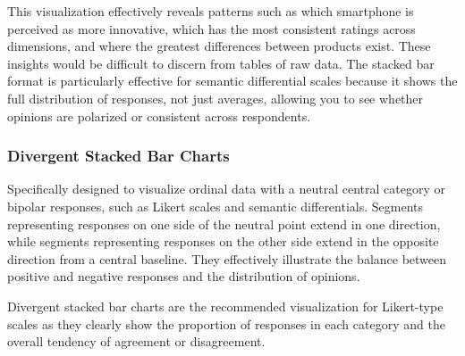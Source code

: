 \documentclass[
  letterpaper,
  DIV=11,
  numbers=noendperiod]{scrartcl}
\begin{document}
This visualization effectively reveals patterns such as which smartphone
is perceived as more innovative, which has the most consistent ratings
across dimensions, and where the greatest differences between products
exist. These insights would be difficult to discern from tables of raw
data. The stacked bar format is particularly effective for semantic
differential scales because it shows the full distribution of responses,
not just averages, allowing you to see whether opinions are polarized or
consistent across respondents.

\hypertarget{divergent-stacked-bar-charts}{%
\subsubsection*{Divergent Stacked Bar
Charts}\label{divergent-stacked-bar-charts}}

Specifically designed to visualize ordinal data with a neutral central
category or bipolar responses, such as Likert scales and semantic
differentials. Segments representing responses on one side of the
neutral point extend in one direction, while segments representing
responses on the other side extend in the opposite direction from a
central baseline. They effectively illustrate the balance between
positive and negative responses and the distribution of opinions.

Divergent stacked bar charts are the recommended visualization for
Likert-type scales as they clearly show the proportion of responses in
each category and the overall tendency of agreement or disagreement.
\end{document}
